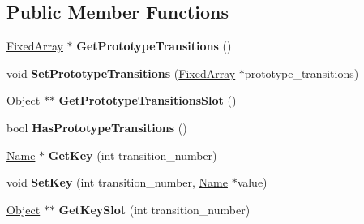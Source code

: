 \subsection*{Public Member Functions}
\begin{DoxyCompactItemize}
\item 
\hyperlink{classv8_1_1internal_1_1_fixed_array}{Fixed\+Array} $\ast$ {\bfseries Get\+Prototype\+Transitions} ()\hypertarget{classv8_1_1internal_1_1_transition_array_ae4c92847fe409691ab3d197fb7e52033}{}\label{classv8_1_1internal_1_1_transition_array_ae4c92847fe409691ab3d197fb7e52033}

\item 
void {\bfseries Set\+Prototype\+Transitions} (\hyperlink{classv8_1_1internal_1_1_fixed_array}{Fixed\+Array} $\ast$prototype\+\_\+transitions)\hypertarget{classv8_1_1internal_1_1_transition_array_a234d1bda7b08e41eb0c5d1a28591c416}{}\label{classv8_1_1internal_1_1_transition_array_a234d1bda7b08e41eb0c5d1a28591c416}

\item 
\hyperlink{classv8_1_1internal_1_1_object}{Object} $\ast$$\ast$ {\bfseries Get\+Prototype\+Transitions\+Slot} ()\hypertarget{classv8_1_1internal_1_1_transition_array_a882a82a8f4b83141745e017bf84e765d}{}\label{classv8_1_1internal_1_1_transition_array_a882a82a8f4b83141745e017bf84e765d}

\item 
bool {\bfseries Has\+Prototype\+Transitions} ()\hypertarget{classv8_1_1internal_1_1_transition_array_a60cda26d8a93728ff533ddd300ddc4d1}{}\label{classv8_1_1internal_1_1_transition_array_a60cda26d8a93728ff533ddd300ddc4d1}

\item 
\hyperlink{classv8_1_1internal_1_1_name}{Name} $\ast$ {\bfseries Get\+Key} (int transition\+\_\+number)\hypertarget{classv8_1_1internal_1_1_transition_array_a7f84a7373bbad266c4bf3f7370d1b5aa}{}\label{classv8_1_1internal_1_1_transition_array_a7f84a7373bbad266c4bf3f7370d1b5aa}

\item 
void {\bfseries Set\+Key} (int transition\+\_\+number, \hyperlink{classv8_1_1internal_1_1_name}{Name} $\ast$value)\hypertarget{classv8_1_1internal_1_1_transition_array_a9e6ae976c5d75c1436c75b6e00248bf9}{}\label{classv8_1_1internal_1_1_transition_array_a9e6ae976c5d75c1436c75b6e00248bf9}

\item 
\hyperlink{classv8_1_1internal_1_1_object}{Object} $\ast$$\ast$ {\bfseries Get\+Key\+Slot} (int transition\+\_\+number)\hypertarget{classv8_1_1internal_1_1_transition_array_a62fe2f9cdf6f2641b0acadeca96666d9}{}\label{classv8_1_1internal_1_1_transition_array_a62fe2f9cdf6f2641b0acadeca96666d9}


\end{DoxyCompactItemize}
